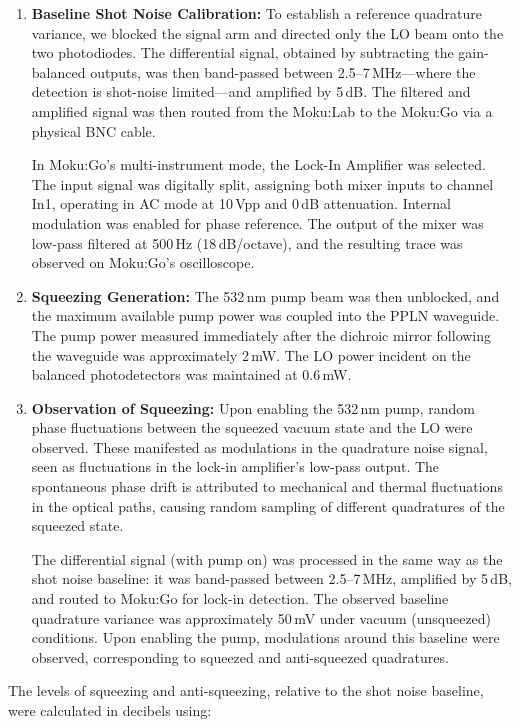 \documentclass[colorlinks=true,pdfstartview=FitV,linkcolor=blue,
citecolor=red,urlcolor=magenta]{ligodoc}
\begin{document}
\begin{enumerate}
    \item \textbf{Baseline Shot Noise Calibration:}  
    To establish a reference quadrature variance, we blocked the signal arm and directed only the LO beam onto the two photodiodes. The differential signal, obtained by subtracting the gain-balanced outputs, was then band-passed between 2.5--7\,MHz—where the detection is shot-noise limited—and amplified by 5\,dB. The filtered and amplified signal was then routed from the Moku:Lab to the Moku:Go via a physical BNC cable.

    In Moku:Go’s multi-instrument mode, the Lock-In Amplifier was selected. The input signal was digitally split, assigning both mixer inputs to channel In1, operating in AC mode at 10\,Vpp and 0\,dB attenuation. Internal modulation was enabled for phase reference. The output of the mixer was low-pass filtered at 500\,Hz (18\,dB/octave), and the resulting trace was observed on Moku:Go’s oscilloscope.

    \item \textbf{Squeezing Generation:}  
    The 532\,nm pump beam was then unblocked, and the maximum available pump power was coupled into the PPLN waveguide. The pump power measured immediately after the dichroic mirror following the waveguide was approximately 2\,mW. The LO power incident on the balanced photodetectors was maintained at 0.6\,mW.

    \item \textbf{Observation of Squeezing:}  
    Upon enabling the 532\,nm pump, random phase fluctuations between the squeezed vacuum state and the LO were observed. These manifested as modulations in the quadrature noise signal, seen as fluctuations in the lock-in amplifier’s low-pass output. The spontaneous phase drift is attributed to mechanical and thermal fluctuations in the optical paths, causing random sampling of different quadratures of the squeezed state.

    The differential signal (with pump on) was processed in the same way as the shot noise baseline: it was band-passed between 2.5--7\,MHz, amplified by 5\,dB, and routed to Moku:Go for lock-in detection. The observed baseline quadrature variance was approximately 50\,mV under vacuum (unsqueezed) conditions. Upon enabling the pump, modulations around this baseline were observed, corresponding to squeezed and anti-squeezed quadratures.
\end{enumerate}

The levels of squeezing and anti-squeezing, relative to the shot noise baseline, were calculated in decibels using:
\end{document}
